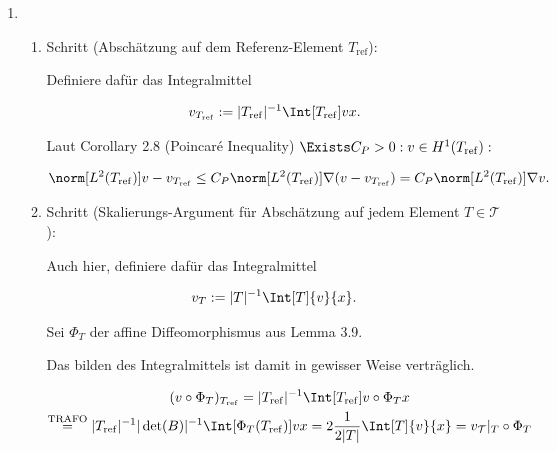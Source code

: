 \begin{solution}

\phantom{}

\begin{enumerate}[label = \textbf{\alph*)}]

  \item
  
  \begin{enumerate}[label = \arabic*.]
 
    \item Schritt (Abschätzung auf dem Referenz-Element $T_\mathrm{ref}$):
    
    Definiere dafür das Integralmittel
    
    \begin{align*}
      v_{T_\mathrm{ref}}
      :=
      |T_\mathrm{ref}|^{-1}
      \Int[T_\mathrm{ref}]{v}{x}.
    \end{align*}
    

    Laut Corollary 2.8 (Poincaré Inequality) $\Exists C_P > 0: v \in H^1(T_\mathrm{ref}):$
  
    \begin{align*}
      \norm[L^2(T_\mathrm{ref})]{v - v_{T_\mathrm{ref}}}
      \leq
      C_P \norm[L^2(T_\mathrm{ref})]{\nabla (v- v_{T_\mathrm{ref}})}
      =
      C_P \norm[L^2(T_\mathrm{ref})]{\nabla v}.
    \end{align*}
    
    \item Schritt (Skalierungs-Argument für Abschätzung auf jedem Element $T \in \mathcal{T}$):
 
    Auch hier, definiere dafür das Integralmittel
    
    \begin{align*}
      v_T
      :=
      |T|^{-1}
      \Int[T]{v}{x}.
    \end{align*}

    Sei $\Phi_T$ der affine Diffeomorphismus aus Lemma 3.9.


    Das bilden des Integralmittels ist damit in gewisser Weise verträglich.

    \begin{multline*}
      (v \circ \Phi_T)_{T_\mathrm{ref}}
      =
      |T_\mathrm{ref}|^{-1}
      \Int[T_\mathrm{ref}]{v \circ \Phi_T}{x} \\
      \stackrel
      {
        \mathrm{TRAFO}
      }{=}
      |T_\mathrm{ref}|^{-1}
      |\det(B)|^{-1}
      \Int[\Phi_T(T_\mathrm{ref})]{v}{x}
      =
      2 \frac{1}{2 |T|}
      \Int[T]{v}{x}
      =
      v_\mathcal{T}|_T \circ \Phi_T
    \end{multline*}
  

\end{enumerate}
\end{enumerate}
\end{solution}
